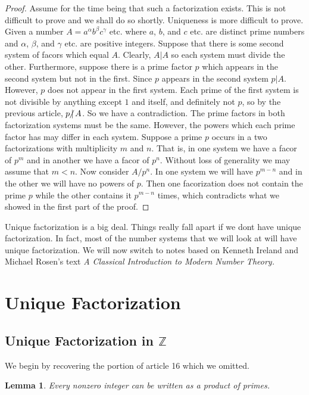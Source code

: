 \documentclass{article}
\theoremstyle{problemstyle}
\newtheorem{lemma}{Lemma}
\newcommand{\ndiv}{\hspace{-4pt}\not|\hspace{2pt}}
\begin{document}
\begin{proof}
Assume for the time being that such a factorization exists. This is not difficult to prove and we shall do so shortly. Uniqueness is more difficult to prove. Given a number $A = a^\alpha b^\beta c^\gamma$ etc. where $a$, $b$, and $c$ etc. are distinct prime numbers and $\alpha$, $\beta$, and $\gamma$ etc. are positive integers. Suppose that there is some second system of facors which equal $A$. Clearly, $A|A$ so each system must divide the other. Furthermore, suppose there is a prime factor $p$ which appears in the second system but not in the first. Since $p$ appears in the second system $p|A$. However, $p$ does not appear in the first system. Each prime of the first system is not divisible by anything except $1$ and itself, and definitely not $p$, so by the previous article, $p\ndiv A$. So we have a contradiction. The prime factors in both factorization systems must be the same. However, the powers which each prime factor has may differ in each system. Suppose a prime $p$ occurs in a two factorizations with multiplicity $m$ and $n$. That is, in one system we have a facor of $p^m$ and in another we have a facor of $p^n$. Without loss of generality we may assume that $m < n$. Now consider $A/p^n$. In one system we will have $p^{m-n}$ and in the other we will have no powers of $p$. Then one facorization does not contain the prime $p$ while the other contains it $p^{m-n}$ times, which contradicts what we showed in the first part of the proof. 
\end{proof}

Unique factorization is a big deal. Things really fall apart if we dont have unique factorization. In fact, most of the number systems that we will look at will have unique factorization. We will now switch to notes based on Kenneth Ireland and Michael Rosen's text \textit{A Classical Introduction to Modern Number Theory.}

\section*{Unique Factorization}
\subsection*{Unique Factorization in $\mathbb{Z}$}

We begin by recovering the portion of article 16 which we omitted. 

\begin{lemma}
Every nonzero integer can be written as a product of primes. 
\end{lemma}
\end{document}
